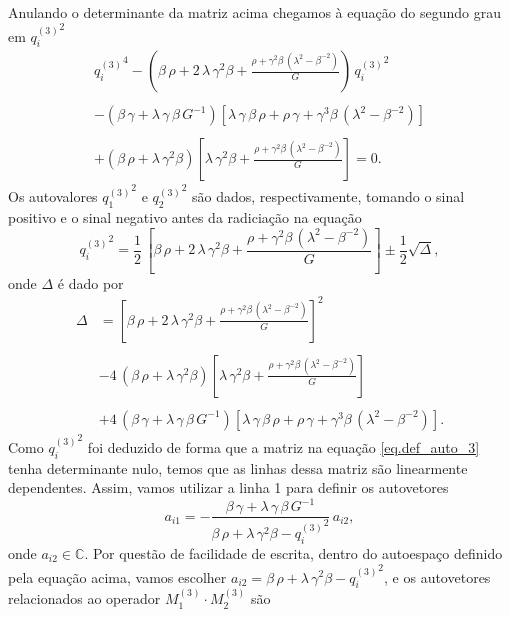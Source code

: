 Anulando o determinante da matriz acima chegamos \`a equa\c{c}\~ao do segundo grau em ${q^{(3)}_i}^2$
\begin{equation*}
\begin{split}
{q^{(3)}_i}^4-\left(\beta\,\rho+2\,\lambda\,\gamma^2\beta+\frac{\rho+\gamma^2\beta\,(\lambda^2-\beta^{-2})}{G}\right)\,{q^{(3)}_i}^2\\\\
-\left(\beta\,\gamma+\lambda\,\gamma\,\beta\,G^{-1}\right)\left[\lambda\,\gamma\,\beta\,\rho+\rho\,\gamma+\gamma^3\beta\,(\lambda^2-\beta^{-2})\right]\\\\
+(\beta\,\rho+\lambda\,\gamma^2\beta)\left[\lambda\,\gamma^2\beta+\frac{\rho+\gamma^2\beta\,(\lambda^2-\beta^{-2})}{G}\right]=0.
\end{split}
\end{equation*}
Os autovalores ${q^{(3)}_1}^2$ e ${q^{(3)}_2}^2$ s\~ao dados, respectivamente, tomando o sinal positivo e o sinal negativo antes da radicia\c{c}\~ao na equa\c{c}\~ao
\begin{equation*}
{q^{(3)}_i}^2=\frac{1}{2}\,\left[\beta\,\rho+2\,\lambda\,\gamma^2\beta+\frac{\rho+\gamma^2\beta\,(\lambda^2-\beta^{-2})}{G}\right]\pm\frac{1}{2}\sqrt{\Delta},
\end{equation*}
onde $\Delta$ \'e dado por
\begin{align*}
\Delta&=
\left[\beta\,\rho+2\,\lambda\,\gamma^2\beta+\frac{\rho+\gamma^2\beta\,(\lambda^2-\beta^{-2})}{G}\right]^2\\\\
&-4\,(\beta\,\rho+\lambda\,\gamma^2\beta)\left[\lambda\,\gamma^2\beta+\frac{\rho+\gamma^2\beta\,(\lambda^2-\beta^{-2})}{G}\right]\\\\
&+4\,\left(\beta\,\gamma+\lambda\,\gamma\,\beta\,G^{-1}\right)\left[\lambda\,\gamma\,\beta\,\rho+\rho\,\gamma+\gamma^3\beta\,(\lambda^2-\beta^{-2})\right].
\end{align*}
Como ${q^{(3)}_i}^2$ foi deduzido de forma que a matriz na equa\c{c}\~ao \ref{eq.def_auto_3} tenha determinante nulo, temos que as linhas dessa matriz s\~ao linearmente dependentes. Assim, vamos utilizar a linha 1 para definir os autovetores
\begin{equation*}
a_{i1}=-\frac{\beta\,\gamma+\lambda\,\gamma\,\beta\,G^{-1}}{\beta\,\rho+\lambda\,\gamma^2\beta-{q^{(3)}_i}^2}\,a_{i2},
\end{equation*}
onde $a_{i2}\in \mathbb{C}$. Por quest\~ao de facilidade de escrita, dentro do autoespa\c{c}o definido pela equa\c{c}\~ao acima, vamos escolher $a_{i2}=\beta\,\rho+\lambda\,\gamma^2\beta-{q^{(3)}_i}^2$, e os autovetores relacionados ao operador $M^{(3)}_1\cdot M^{(3)}_2$ s\~ao
